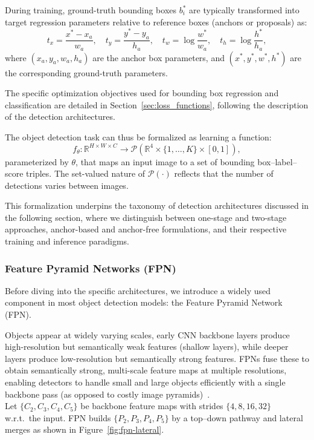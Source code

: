 During training, ground-truth bounding boxes $b_i^\ast$ are typically transformed into target regression parameters relative to reference boxes (anchors or proposals) as:
$$
t_x = \frac{x^\ast - x_a}{w_a}, \quad
t_y = \frac{y^\ast - y_a}{h_a}, \quad
t_w = \log \frac{w^\ast}{w_a}, \quad
t_h = \log \frac{h^\ast}{h_a},
$$
where $(x_a, y_a, w_a, h_a)$ are the anchor box parameters, and $(x^\ast, y^\ast, w^\ast, h^\ast)$ are the corresponding ground-truth parameters.

The specific optimization objectives used for bounding box regression and classification are detailed in Section~\ref{sec:loss_functions}, following the description of the detection architectures.

The object detection task can thus be formalized as learning a function:
$$
f_\theta: \mathbb{R}^{H \times W \times C} \to \mathcal{P}(\mathbb{R}^4 \times \{1, \dots, K\} \times [0,1]),
$$
parameterized by $\theta$, that maps an input image to a set of bounding box--label--score triples.
The set-valued nature of $\mathcal{P}(\cdot)$ reflects that the number of detections varies between images.

This formalization underpins the taxonomy of detection architectures discussed in the following section, where we distinguish between one-stage and two-stage approaches, anchor-based and anchor-free formulations, and their respective training and inference paradigms.

\subsubsection{Feature Pyramid Networks (FPN)}
Before diving into the specific architectures, we introduce a widely used component in most object detection models: the Feature Pyramid Network (FPN).

Objects appear at widely varying scales, early CNN backbone layers produce high-resolution but semantically weak features (shallow layers), while deeper layers produce low-resolution but semantically strong features.
FPNs fuse these to obtain semantically strong, multi-scale feature maps at multiple resolutions, enabling detectors to handle small and large objects efficiently with a single backbone pass (as opposed to costly image pyramids)~\cite{lin2017fpn}.\\

Let $\{C_2,C_3,C_4,C_5\}$ be backbone feature maps with strides $\{4,8,16,32\}$ w.r.t.\ the input.
FPN builds $\{P_2,P_3,P_4,P_5\}$ by a top–down pathway and lateral merges as shown in Figure~\ref{fig:fpn-lateral}.


